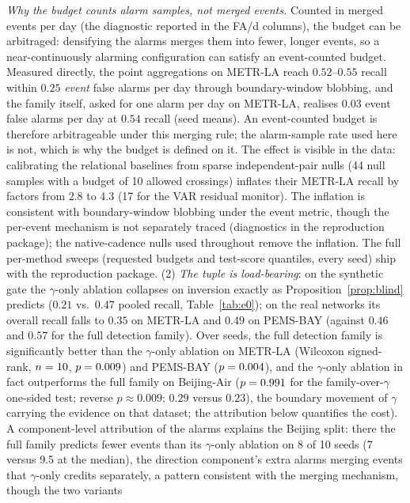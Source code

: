 \documentclass[11pt,a4paper]{article}
\begin{document}
\emph{Why the budget counts alarm samples, not merged events.} Counted in
merged events per day (the diagnostic reported in the FA/d columns), the
budget can be arbitraged: densifying the alarms merges them into fewer,
longer events, so a near-continuously alarming configuration can satisfy an
event-counted budget. Measured directly, the point aggregations on METR-LA
reach $0.52$--$0.55$ recall within $0.25$ \emph{event} false alarms per day
through boundary-window blobbing, and the family itself, asked for one
alarm per day on METR-LA, realises $0.03$ event false alarms per day at
$0.54$ recall (seed means). An event-counted budget is therefore arbitrageable under this merging
rule; the alarm-sample rate used here is not, which is why the budget is
defined on it. The effect is visible in the data: calibrating the relational
baselines from sparse independent-pair nulls (44 null samples with a
budget of 10 allowed crossings) inflates their METR-LA recall by factors
from 2.8 to 4.3 (17 for the VAR residual monitor). The inflation is
consistent with boundary-window blobbing under the event metric, though
the per-event mechanism is not separately traced (diagnostics in the
reproduction package); the native-cadence nulls used throughout remove
the inflation. The full
per-method sweeps (requested budgets and test-score quantiles, every seed)
ship with the reproduction package. (2) \emph{The tuple is load-bearing}: on the synthetic gate the
$\gamma$-only ablation collapses on inversion exactly as
Proposition~\ref{prop:blind} predicts ($0.21$ vs.\ $0.47$ pooled recall,
Table~\ref{tab:e0}); on the real networks its overall recall falls to
$0.35$ on METR-LA and $0.49$ on PEMS-BAY (against $0.46$ and $0.57$ for
the full detection family).
Over seeds, the full detection family is significantly better than the $\gamma$-only
ablation on METR-LA (Wilcoxon signed-rank, $n=10$,
$p=0.009$) and PEMS-BAY ($p=0.004$), and the $\gamma$-only ablation
in fact outperforms the full family on Beijing-Air ($p=0.991$ for
the family-over-$\gamma$ one-sided test; reverse $p\approx 0.009$;
$0.29$ versus $0.23$), the boundary movement of $\gamma$ carrying the
evidence on that dataset; the attribution below quantifies the cost). A component-level
attribution of the alarms explains the Beijing split: there the full
family predicts fewer events than its $\gamma$-only ablation on 8 of
10 seeds (7 versus 9.5 at the median), the direction component's
extra alarms merging events that $\gamma$-only credits separately, a
pattern consistent with the merging mechanism, though the two variants
\end{document}
